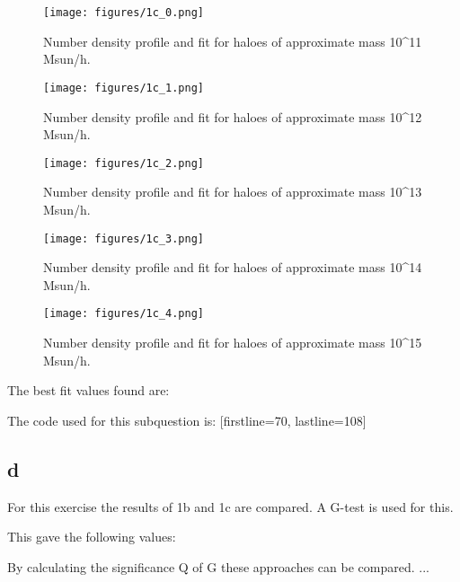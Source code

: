 \begin{figure}
    \centering
    \texttt{[image: figures/1c\_0.png]}
    \caption{Number density profile and fit for haloes of approximate mass 10^11 Msun/h.}
    \label{fig:ex1c_0}
\end{figure}
\begin{figure}
    \centering
    \texttt{[image: figures/1c\_1.png]}
    \caption{Number density profile and fit for haloes of approximate mass 10^12 Msun/h.}
    \label{fig:ex1c_1}
\end{figure}
\begin{figure}
    \centering
    \texttt{[image: figures/1c\_2.png]}
    \caption{Number density profile and fit for haloes of approximate mass 10^13 Msun/h.}
    \label{fig:ex1c_2}
\end{figure}
\begin{figure}
    \centering
    \texttt{[image: figures/1c\_3.png]}
    \caption{Number density profile and fit for haloes of approximate mass 10^14 Msun/h.}
    \label{fig:ex1c_3}
\end{figure}
\begin{figure}
    \centering
    \texttt{[image: figures/1c\_4.png]}
    \caption{Number density profile and fit for haloes of approximate mass 10^15 Msun/h.}
    \label{fig:ex1c_4}
\end{figure}

The best fit values found are:


The code used for this subquestion is:
[firstline=70, lastline=108]

\subsection*{d}
For this exercise the results of 1b and 1c are compared.
A G-test is used for this.

This gave the following values:


By calculating the significance Q of G these approaches can be compared.
...